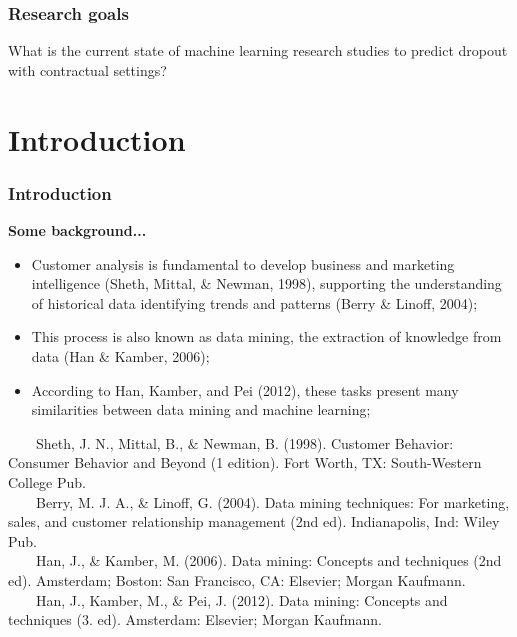\documentclass[10pt]{beamer}
\begin{document}
\begin{frame}
	\frametitle{Research goals}
	\Large{What is the current state of machine learning research studies to predict dropout with contractual settings?}

	
\end{frame}

\section{Introduction} %

\begin{frame}
	\frametitle{Introduction}
	\Large
	\textbf{Some background...}\\
		\begin{itemize} \normalsize
			\item Customer analysis is fundamental to develop business and marketing intelligence \footnotesize(Sheth, Mittal, \& Newman, 1998)\normalsize, supporting the understanding of historical data identifying trends and patterns \footnotesize(Berry \& Linoff, 2004)\normalsize;
			\item This process is also known as data mining, the extraction of knowledge from data \footnotesize(Han \& Kamber, 2006)\normalsize;
			\item According to \footnotesize Han, Kamber, and Pei (2012)\normalsize, these tasks present many similarities between data mining and machine learning;
		\end{itemize}	
	\tiny
	~~~~Sheth, J. N., Mittal, B., \& Newman, B. (1998). Customer Behavior: Consumer Behavior and Beyond (1 edition). Fort Worth, TX: South-Western College Pub. \\
	~~~~Berry, M. J. A., \& Linoff, G. (2004). Data mining techniques: For marketing, sales, and customer relationship management (2nd ed). Indianapolis, Ind: Wiley Pub.\\
	~~~~Han, J., \& Kamber, M. (2006). Data mining: Concepts and techniques (2nd ed). Amsterdam; Boston: San Francisco, CA: Elsevier; Morgan Kaufmann.\\
	~~~~Han, J., Kamber, M., \& Pei, J. (2012). Data mining: Concepts and techniques (3. ed). Amsterdam: Elsevier; Morgan Kaufmann.\\

\end{frame}
\end{document}
